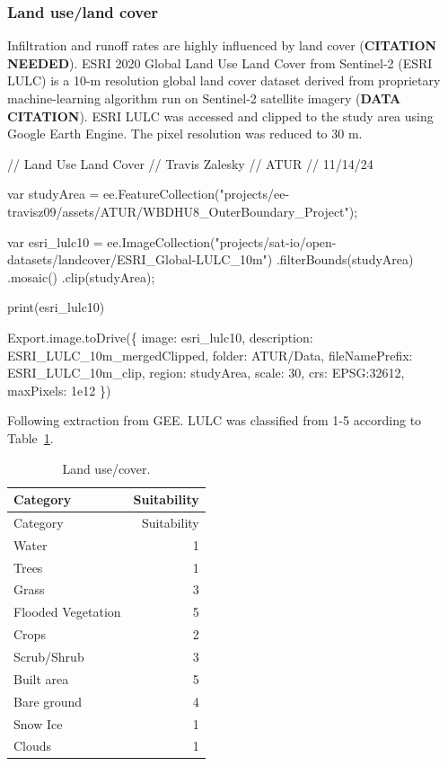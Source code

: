 \documentclass[
]{agujournal2019}
\newenvironment{Shaded}{\begin{snugshade}}{\end{snugshade}}
\newcommand{\NormalTok}[1]{\textcolor[rgb]{0.00,0.23,0.31}{#1}}
\begin{document}
\subsubsection{Land use/land cover}\label{land-useland-cover}

Infiltration and runoff rates are highly influenced by land cover
(\textbf{CITATION NEEDED}). ESRI 2020 Global Land Use Land Cover from
Sentinel-2 (ESRI LULC) is a 10-m resolution global land cover dataset
derived from proprietary machine-learning algorithm run on Sentinel-2
satellite imagery (\textbf{DATA CITATION}). ESRI LULC was accessed and
clipped to the study area using Google Earth Engine. The pixel
resolution was reduced to 30 m.

\begin{Shaded}
\begin{Highlighting}[]
\NormalTok{// Land Use Land Cover}
\NormalTok{// Travis Zalesky}
\NormalTok{// ATUR}
\NormalTok{// 11/14/24}

\NormalTok{var studyArea = ee.FeatureCollection("projects/ee{-}travisz09/assets/ATUR/WBDHU8\_OuterBoundary\_Project");}

\NormalTok{var esri\_lulc10 = ee.ImageCollection("projects/sat{-}io/open{-}datasets/landcover/ESRI\_Global{-}LULC\_10m")}
\NormalTok{  .filterBounds(studyArea)}
\NormalTok{  .mosaic()}
\NormalTok{  .clip(studyArea);}
  
\NormalTok{print(esri\_lulc10)}

\NormalTok{Export.image.toDrive(\{}
\NormalTok{  image: esri\_lulc10, }
\NormalTok{  description: \textquotesingle{}ESRI\_LULC\_10m\_mergedClipped\textquotesingle{},}
\NormalTok{  folder: \textquotesingle{}ATUR/Data\textquotesingle{},}
\NormalTok{  fileNamePrefix: \textquotesingle{}ESRI\_LULC\_10m\_clip\textquotesingle{},}
\NormalTok{  region: studyArea,}
\NormalTok{  scale: 30,}
\NormalTok{  crs: \textquotesingle{}EPSG:32612\textquotesingle{},}
\NormalTok{  maxPixels: 1e12}
\NormalTok{\})}
\end{Highlighting}
\end{Shaded}

Following extraction from GEE. LULC was classified from 1-5 according to
Table~\ref{tbl-lulc}.

\begin{longtable}[]{@{}lr@{}}
\caption{Land use/cover.}\label{tbl-lulc}\tabularnewline
\toprule\noalign{}
Category & Suitability \\
\midrule\noalign{}
\endfirsthead
\toprule\noalign{}
Category & Suitability \\
\midrule\noalign{}
\endhead
\bottomrule\noalign{}
\endlastfoot
Water & 1 \\
Trees & 1 \\
Grass & 3 \\
Flooded Vegetation & 5 \\
Crops & 2 \\
Scrub/Shrub & 3 \\
Built area & 5 \\
Bare ground & 4 \\
Snow Ice & 1 \\
Clouds & 1 \\
\end{longtable}
\end{document}
